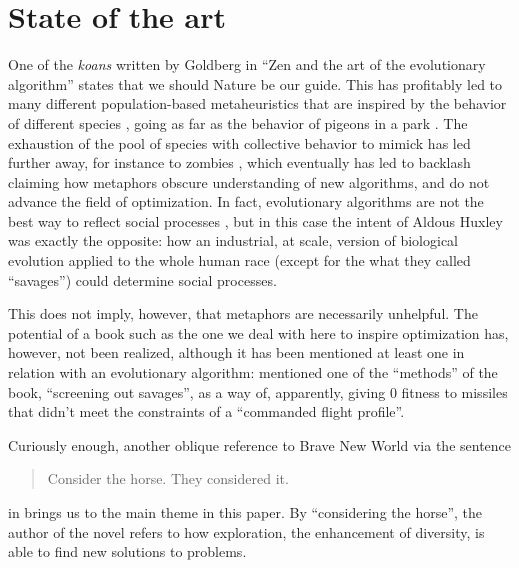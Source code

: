 \section{State of the art}


One of the {\em koans} written by Goldberg in ``Zen and the art of the
evolutionary algorithm'' states that we should Nature be our guide. This has
profitably led to many different population-based metaheuristics that are
inspired by the behavior of different species \cite{nedjah2020inspiration}, going as far as the behavior of
pigeons in a park \cite{blanco2019urban}. The exhaustion of the pool of
species with collective behavior to mimick has led further away, for instance to
zombies \cite{nguyen2012zombie}, which eventually has led to backlash
\cite{metaphor_exposed} claiming how metaphors obscure understanding of new
algorithms, and do not advance the field of optimization. In fact, evolutionary
algorithms are not the best way to reflect social processes
\cite{chattoe1998just}, but in this case the intent of Aldous Huxley was exactly
the opposite: how an industrial, at scale, version of biological evolution
applied to the whole human race (except for the what they called ``savages'')
could determine social processes.

This does not imply, however, that metaphors are necessarily
unhelpful. The potential of a book such as the one we deal with here to inspire
optimization has, however, not been realized, although it has been
mentioned at least one in relation with an evolutionary algorithm:
\cite{wollam1999reverse} mentioned one of the ``methods'' of the book,
``screening out savages'', as a way of, apparently, giving 0 fitness
to missiles that didn't meet the constraints of a ``commanded flight
profile''.

Curiously enough, another oblique reference to Brave New World via the
sentence
\begin{quote}
  Consider the horse. They considered it.
  \end{quote}
in \cite{DBLP:journals/corr/abs-2107-00314} brings us to the main
theme in this paper. By ``considering the horse'', the author of the
novel refers to how exploration, the enhancement of diversity, is able
to find new solutions to problems.

